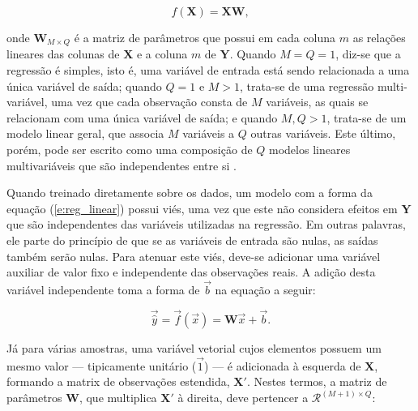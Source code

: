     \begin{equation} \label{e:reg_linear}
      f(\boldsymbol{X}) = \boldsymbol{X} \boldsymbol{W}
      ,
    \end{equation}

    \noindent onde $\boldsymbol{W}_{M\times Q}$ é a matriz de parâmetros que possui em cada coluna $m$ as relações lineares das colunas de $\boldsymbol{X}$ e a coluna $m$ de $\boldsymbol{Y}$. Quando $M=Q=1$, diz-se que a regressão é simples, isto é, uma variável de entrada está sendo relacionada a uma única variável de saída; quando $Q = 1$ e $M > 1$, trata-se de uma regressão multi-variável, uma vez que cada observação consta de $M$ variáveis, as quais se relacionam com uma única variável de saída; e quando $M,Q>1$, trata-se de um modelo linear geral, que associa $M$ variáveis a $Q$ outras variáveis. Este último, porém, pode ser escrito como uma composição de $Q$ modelos lineares multivariáveis que são independentes entre si .

    Quando treinado diretamente sobre os dados, um modelo com a forma da equação (\ref{e:reg_linear}) possui viés, uma vez que este não considera efeitos em $\boldsymbol{Y}$ que são independentes das variáveis utilizadas na regressão. Em outras palavras, ele parte do princípio de que se as variáveis de entrada são nulas, as saídas também serão nulas. Para atenuar este viés, deve-se adicionar uma variável auxiliar de valor fixo e independente das observações reais. A adição desta variável independente toma a forma de $\vec{b}$ na equação a seguir:

    \begin{equation} \label{e:reg_linear_amostra_b}
      \vec{\hat{y}} = \vec{f}(\vec{x}) = \boldsymbol{W} \vec{x} + \vec{b}
      .
    \end{equation}


    Já para várias amostras, uma variável vetorial cujos elementos possuem um mesmo valor --- tipicamente unitário ($\vec{1}$) --- é adicionada à esquerda de $\boldsymbol{X}$, formando a matrix de observações estendida, $\boldsymbol{X}'$. Nestes termos, a matriz de parâmetros $\boldsymbol{W}$, que multiplica $\boldsymbol{X}'$ à direita, deve pertencer a $\mathcal{R}^{(M+1) \times Q}$:

